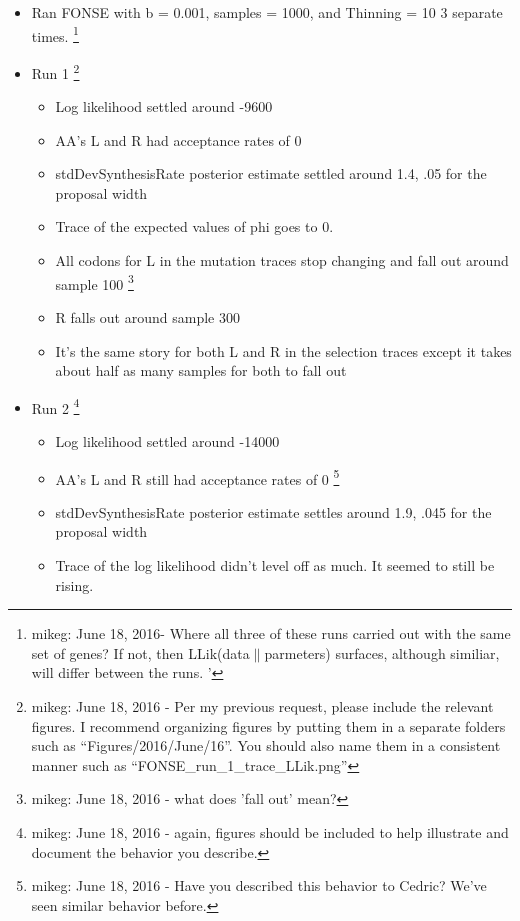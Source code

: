 \documentclass[11pt]{labbook}
\begin{document}
    \begin{itemize}
        \item Ran FONSE with b = 0.001, samples = 1000, and Thinning = 10 3 separate times. \footnote{mikeg: June 18, 2016- Where all three of these runs carried out with the same set of genes?
If not, then LLik(data$\|$parmeters) surfaces, although similiar, will differ between the runs.
'}
        \item Run 1 \footnote{mikeg: June 18, 2016 - Per my previous request, please include the relevant figures.
        I recommend organizing figures by putting them in a separate folders such as ``Figures/2016/June/16''.
        You should also name them in a consistent manner such as ``FONSE\_run\_1\_trace\_LLik.png''
      }
        \begin{itemize}
          \item Log likelihood settled around -9600
          \item AA's L and R had acceptance rates of 0
          \item stdDevSynthesisRate posterior estimate settled around 1.4, .05 for the proposal width
          \item Trace of the expected values of phi goes to 0.
          \item All codons for L in the mutation traces stop changing and fall out around sample 100 \footnote{mikeg: June 18, 2016 - what does 'fall out' mean?}
          \item R falls out around sample 300
          \item It's the same story for both L and R in the selection traces except it takes about half as many samples for both to fall out
        \end{itemize}
        \item Run 2 \footnote{mikeg: June 18, 2016 - again, figures should be included to help illustrate and document the behavior you describe.}
        \begin{itemize}
            \item Log likelihood settled around -14000
            \item AA's L and R still had acceptance rates of 0 \footnote{mikeg: June 18, 2016 - Have you described this behavior to Cedric? 
                We've seen similar behavior before.}
            \item stdDevSynthesisRate posterior estimate settles around 1.9, .045 for the proposal width
            \item Trace of the log likelihood didn't level off as much. It seemed to still be rising. 

\end{itemize}
\end{itemize}
\end{document}
